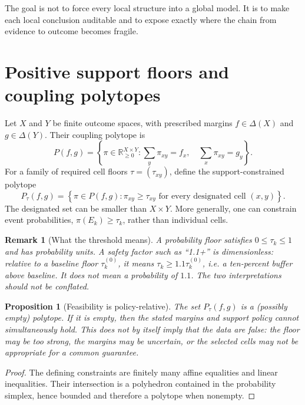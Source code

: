\documentclass[11pt]{article}
\newtheorem{proposition}[definition]{Proposition}
\newtheorem{remark}[definition]{Remark}
\begin{document}
The goal is not to force every local structure into a global model. It is to make each local conclusion auditable and to expose exactly where the chain from evidence to outcome becomes fragile.

\section{Positive support floors and coupling polytopes}

Let $X$ and $Y$ be finite outcome spaces, with prescribed margins $f\in\Delta(X)$ and $g\in\Delta(Y)$. Their coupling polytope is
\[
  P(f,g)=\left\{\pi\in\mathbb{R}_{\geq 0}^{X\times Y}:
  \sum_y\pi_{xy}=f_x,\quad \sum_x\pi_{xy}=g_y\right\}.
\]
For a family of required cell floors $\tau=(\tau_{xy})$, define the support-constrained polytope
\begin{equation}\label{eq:truncated}
  P_{\tau}(f,g)=\left\{\pi\in P(f,g):\pi_{xy}\geq\tau_{xy}\text{ for every designated cell }(x,y)\right\}.
\end{equation}
The designated set can be smaller than $X\times Y$. More generally, one can constrain event probabilities, $\pi(E_k)\geq\tau_k$, rather than individual cells.

\begin{remark}[What the threshold means]
A probability floor satisfies $0\leq\tau_k\leq1$ and has probability units. A safety factor such as ``1.1+'' is dimensionless: relative to a baseline floor $\tau_k^{(0)}$, it means $\tau_k\geq1.1\tau_k^{(0)}$, i.e. a ten-percent buffer above baseline. It does not mean a probability of $1.1$. The two interpretations should not be conflated.
\end{remark}

\begin{proposition}[Feasibility is policy-relative]
The set $P_\tau(f,g)$ is a (possibly empty) polytope. If it is empty, then the stated margins and support policy cannot simultaneously hold. This does not by itself imply that the data are false: the floor may be too strong, the margins may be uncertain, or the selected cells may not be appropriate for a common guarantee.
\end{proposition}

\begin{proof}
The defining constraints are finitely many affine equalities and linear inequalities. Their intersection is a polyhedron contained in the probability simplex, hence bounded and therefore a polytope when nonempty.
\end{proof}
\end{document}
